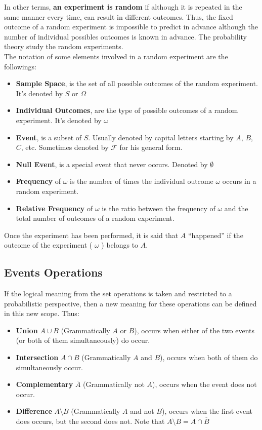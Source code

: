  In other terms, \textbf{an experiment is random} if although it is repeated in the same manner every time, can result in different outcomes. 
 Thus, the fixed outcome of a random experiment is impossible to predict in advance although the number of individual possibles outcomes is known in 
 advance.
 The probability theory study the random experiments.\\

 The notation of some elements involved in a random experiment are the followings:
 \begin{itemize}
     \item \textbf{Sample Space}, is the set of all possible outcomes of the random experiment. It's denoted by $S$ or $\Omega$
     \item \textbf{Individual Outcomes}, are the type of possible outcomes of a random experiment. It's denoted by $\omega$
     \item \textbf{Event}, is a subset of $S$. Usually denoted by capital letters starting by $A$, $B$, $C$, etc. 
        Sometimes denoted by $\mathcal{F}$ for his general form. 
     \item \textbf{Null Event}, is a special event that never occurs. Denoted by $\emptyset$
     \item \textbf{Frequency} of $\omega$ is the number of times the individual outcome $\omega$ occurs in a random experiment.
     \item \textbf{Relative Frequency} of $\omega$ is the ratio between the frequency of $\omega$ and the total number of outcomes of a random experiment.
 \end{itemize}

 Once the experiment has been performed, it is said that $A$ “happened” if the outcome of the experiment ( $\omega$ ) belongs to $A$. 

 \subsection{Events Operations}
If the logical meaning from the set operations is taken and restricted to a probabilistic perspective, then a new meaning for these operations can be defined
in this new scope. Thus:
\begin{itemize}
    \item \textbf{Union} $A \cup B$ (Grammatically $A$ or $B$), occurs when either of the two events (or both of them simultaneously) do occur.
    \item \textbf{Intersection} $A \cap B$ (Grammatically $A$ and $B$), occurs when both of them do simultaneously occur.
    \item \textbf{Complementary} $\overline{A}$ (Grammatically not $A$), occurs when the event does not occur.
    \item \textbf{Difference} $A \setminus B$ (Grammatically $A$ and not $B$), occurs when the first event does occurs, but the second does not. 
                Note that $A \setminus B = A \cap \overline{B}$
\end{itemize}

